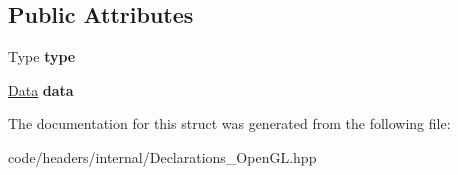 \subsection*{Public Attributes}
\begin{DoxyCompactItemize}
\item 
\mbox{\label{structprz_1_1_var___g_l_a5e0dcbc8c66862390e390bf6c6737552}} 
Type {\bfseries type}
\item 
\mbox{\label{structprz_1_1_var___g_l_a403de554da298691aa66c5c56b72373b}} 
\mbox{\hyperlink{unionprz_1_1_var___g_l_1_1_data}{Data}} {\bfseries data}
\end{DoxyCompactItemize}


The documentation for this struct was generated from the following file\+:\begin{DoxyCompactItemize}
\item 
code/headers/internal/Declarations\+\_\+\+Open\+G\+L.\+hpp\end{DoxyCompactItemize}
